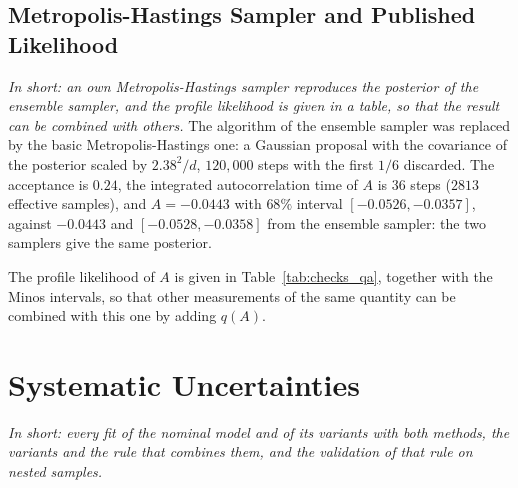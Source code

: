 \subsection{Metropolis-Hastings Sampler and Published Likelihood}
\label{sec:checks_mh}
\emph{In short: an own Metropolis-Hastings sampler reproduces the posterior of the ensemble sampler, and the profile likelihood is given in a table, so that the result can be combined with others.}
The algorithm of the ensemble sampler was replaced by the basic Metropolis-Hastings one: a Gaussian proposal with the covariance of the posterior scaled by $2.38^2/d$, $120{,}000$ steps with the first $1/6$ discarded. The acceptance is $0.24$, the integrated autocorrelation time of $A$ is $36$ steps ($2813$ effective samples), and $A=-0.0443$ with $68\%$ interval $[-0.0526,-0.0357]$, against $-0.0443$ and $[-0.0528,-0.0358]$ from the ensemble sampler: the two samplers give the same posterior.

The profile likelihood of $A$ is given in Table~\ref{tab:checks_qa}, together with the Minos intervals, so that other measurements of the same quantity can be combined with this one by adding $q(A)$.

\begin{table}[h]
\centering
{}
\caption{Profile likelihood ratio $q(A)=-2\Delta\ln L$ of the nominal fit (other parameters profiled); minimum at $-0.0441$, Minos intervals $[-0.0526,-0.0356]$ ($68\%$) and $[-0.0607,-0.0275]$ ($95\%$).}
\label{tab:checks_qa}
\end{table}

\FloatBarrier

\section{Systematic Uncertainties}
\label{app:syst}
\emph{In short: every fit of the nominal model and of its variants with both methods, the variants and the rule that combines them, and the validation of that rule on nested samples.}

